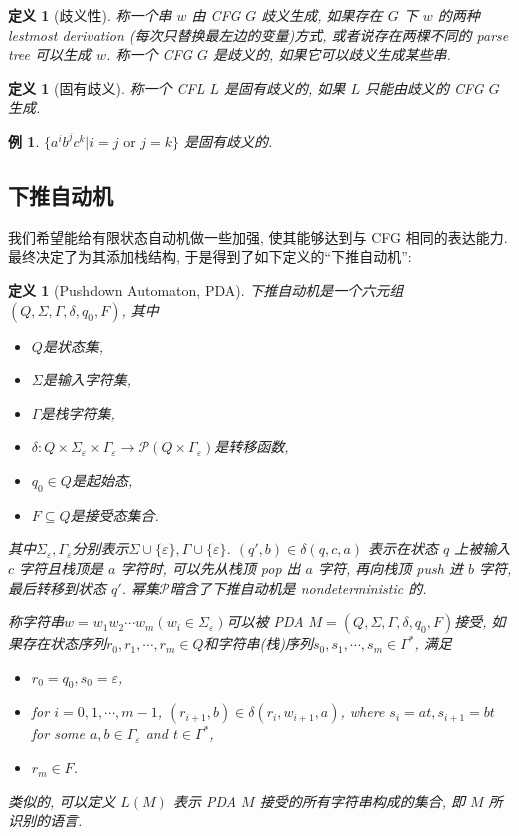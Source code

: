 \documentclass[8pt]{article}
\theoremstyle{compact}
\newtheorem{definition}[theorem]{定义}
\newtheorem{example}[theorem]{例}
\begin{document}
\begin{definition}[歧义性]
	称一个串 $w$ 由 CFG $G$ 歧义生成, 如果存在 $G$ 下 $w$ 的两种 lestmost derivation (每次只替换最左边的变量)方式, 或者说存在两棵不同的 parse tree 可以生成 $w$. 称一个 CFG $G$ 是歧义的, 如果它可以歧义生成某些串.
\end{definition}
\begin{definition}[固有歧义]
	称一个 CFL $L$ 是固有歧义的, 如果 $L$ 只能由歧义的 CFG $G$ 生成.
\end{definition}
\begin{example}
	$\{a^ib^jc^k | i = j \textrm{ or } j = k\}$ 是固有歧义的.
\end{example}

\subsection{下推自动机}

我们希望能给有限状态自动机做一些加强, 使其能够达到与 CFG 相同的表达能力. 最终决定了为其添加栈结构, 于是得到了如下定义的“下推自动机”:

\begin{definition}[Pushdown Automaton, PDA]
	下推自动机是一个六元组$(Q, \Sigma, \Gamma, \delta, q_0, F)$, 其中
	\begin{itemize}
		\item $Q$是状态集, 
		\item $\Sigma$是输入字符集, 
		\item $\Gamma$是栈字符集, 
		\item $\delta: Q \times \Sigma_{\varepsilon} \times \Gamma_{\varepsilon} \to \mathcal P(Q \times \Gamma_{\varepsilon})$是转移函数, 
		\item $q_0 \in Q$是起始态, 
		\item $F \subseteq Q$是接受态集合. 
	\end{itemize}

	其中$\Sigma_{\varepsilon}, \Gamma_{\varepsilon}$分别表示$\Sigma \cup \{\varepsilon\}, \Gamma \cup \{\varepsilon\}$. $(q', b) \in \delta(q, c, a)$ 表示在状态 $q$ 上被输入 $c$ 字符且栈顶是 $a$ 字符时, 可以先从栈顶 pop 出 $a$ 字符, 再向栈顶 push 进 $b$ 字符, 最后转移到状态 $q'$. 幂集$\mathcal P$暗含了下推自动机是 nondeterministic 的. 

	称字符串$w = w_1w_2\cdots w_m(w_i \in \Sigma_{\varepsilon})$可以被 PDA $M = (Q, \Sigma, \Gamma, \delta, q_0, F)$接受, 如果存在状态序列$r_0, r_1, \cdots, r_m \in Q$和字符串(栈)序列$s_0, s_1, \cdots, s_m \in \Gamma^*$, 满足
	\begin{itemize}
		\item $r_0 = q_0, s_0 = \varepsilon$,
		\item for $i = 0, 1, \cdots, m-1$, $(r_{i+1}, b) \in \delta(r_i, w_{i+1}, a)$, where $s_i = at, s_{i+1}=bt$ for some $a, b \in \Gamma_{\varepsilon}$ and $t \in \Gamma^*$,
		\item $r_m \in F$.
	\end{itemize}

	类似的, 可以定义 $L(M)$ 表示 PDA $M$ 接受的所有字符串构成的集合, 即 $M$ 所识别的语言.
\end{definition}
\end{document}
